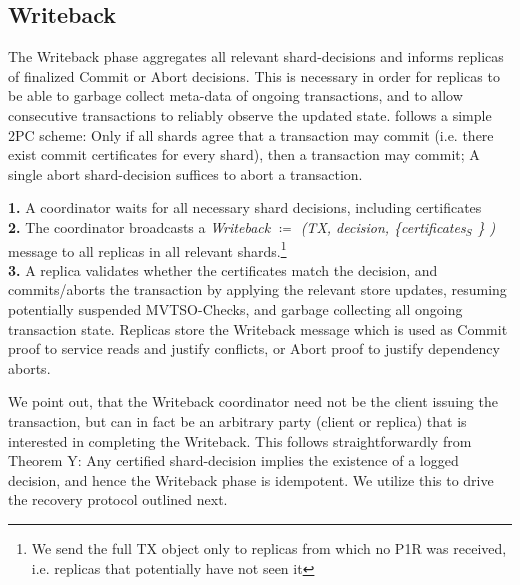 \subsection{Writeback} 

The Writeback phase aggregates all relevant shard-decisions and informs replicas of finalized Commit or Abort decisions. This is necessary in order for replicas to be able to garbage collect meta-data of ongoing transactions, and to allow consecutive transactions to reliably observe the updated state. \sys follows a simple 2PC scheme: Only if all shards agree that a transaction may commit (i.e. there exist commit certificates for every shard), then a transaction may commit; A single abort shard-decision suffices to abort a transaction.

\textbf{1.} A coordinator waits for all necessary shard decisions, including certificates\\
\textbf{2.} The coordinator broadcasts a \textit{Writeback $\coloneqq$ (TX, decision, \{certificates$_S$ \} )} message to all replicas in all relevant shards.\footnote{We send the full TX object only to replicas from which no P1R was received, i.e. replicas that potentially have not seen it}\\
\textbf{3.} A replica validates whether the certificates match the decision, and commits/aborts the transaction by applying the relevant store updates, resuming potentially suspended MVTSO-Checks, and garbage collecting all ongoing transaction state. Replicas store the Writeback message which is used as Commit proof to service reads and justify conflicts, or Abort proof to justify dependency aborts.

We point out, that the Writeback coordinator need not be the client issuing the transaction, but can in fact be an arbitrary party (client or replica) that is interested in completing the Writeback. This follows straightforwardly from Theorem Y: Any certified shard-decision implies the existence of a logged decision, and hence the Writeback phase is idempotent.
We utilize this to drive the recovery protocol outlined next. 

